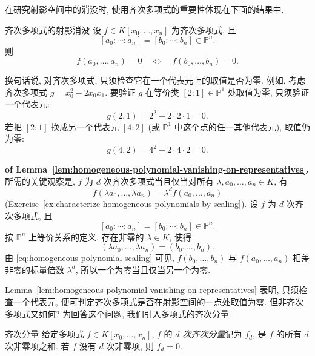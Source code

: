 在研究射影空间中的消没时, 使用齐次多项式的重要性体现在下面的结果中.

\begin{Lemma}{齐次多项式的射影消没}\leavevmode\label{lem:homogeneous-polynomial-vanishing-on-representatives}
设 $f\in K[x_{0},\ldots,x_{n}]$ 为齐次多项式, 且
\[
  [a_{0}:\cdots:a_{n}]=[b_{0}:\cdots:b_{n}]\in\mathbb{P}^{n}.
\]
则
\[
  f(a_{0},\ldots,a_{n})=0\quad\Longleftrightarrow\quad f(b_{0},\ldots,b_{n})=0.
\]
\end{Lemma}

换句话说, 对齐次多项式, 只须检查它在一个代表元上的取值是否为零. 例如, 考虑齐次多项式 $g=x_{0}^{2}-2x_{0}x_{1}$. 要验证 $g$ 在等价类 $[2:1]\in\mathbb{P}^{1}$ 处取值为零, 只须验证一个代表元:
\[
  g(2,1)=2^{2}-2\cdot2\cdot1=0.
\]
若把 $[2:1]$ 换成另一个代表元 $[4:2]$ (或 $\mathbb{P}^{1}$ 中这个点的任一其他代表元), 取值仍为零:
\[
  g(4,2)=4^{2}-2\cdot4\cdot2=0.
\]

\begin{Proof}\textbf{of Lemma~\ref{lem:homogeneous-polynomial-vanishing-on-representatives}.}\quad
所需的关键观察是, $f$ 为 $d$ 次齐次多项式当且仅当对所有 $\lambda,a_{0},\ldots,a_{n}\in K$, 有
\begin{equation}\label{eq:homogeneous-polynomial-scaling}
  f(\lambda a_{0},\ldots,\lambda a_{n})=\lambda^{d}f(a_{0},\ldots,a_{n})
\end{equation}
(Exercise~\ref{ex:characterize-homogeneous-polynomials-by-scaling}). 设 $f$ 为 $d$ 次齐次多项式, 且
\[
  [a_{0}:\cdots:a_{n}]=[b_{0}:\cdots:b_{n}]\in\mathbb{P}^{n}.
\]
按 $\mathbb{P}^{n}$ 上等价关系的定义, 存在非零的 $\lambda\in K$, 使得
\[
  (\lambda a_{0},\ldots,\lambda a_{n})=(b_{0},\ldots,b_{n}).
\]
由 \eqref{eq:homogeneous-polynomial-scaling} 可见, $f(b_{0},\ldots,b_{n})$ 与 $f(a_{0},\ldots,a_{n})$ 相差非零的标量倍数 $\lambda^{d}$, 所以一个为零当且仅当另一个为零.
\end{Proof}

Lemma~\ref{lem:homogeneous-polynomial-vanishing-on-representatives} 表明, 只须检查一个代表元, 便可判定齐次多项式是否在射影空间的一点处取值为零. 但非齐次多项式又如何? 为回答这个问题, 我们引入多项式的齐次分量.

\begin{Definition}{齐次分量}\leavevmode\label{def:homogeneous-components}
给定多项式 $f\in K[x_{0},\ldots,x_{n}]$, $f$ 的 \emph{$d$ 次齐次分量}记为 $f_{d}$, 是 $f$ 的所有 $d$ 次非零项之和. 若 $f$ 没有 $d$ 次非零项, 则 $f_{d}=0$.
\end{Definition}

